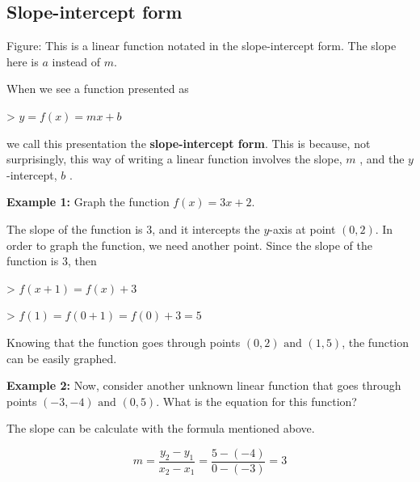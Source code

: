 \subsection{Slope-intercept form}
\label{sss:slop-2233}







Figure: This is a linear function notated in the slope-intercept form. The slope here is
$a$ instead of $m$.



When we see a function presented as



> $y=f(x)=mx+b$



we call this presentation the \textbf{slope-intercept form}. This is because, not
surprisingly, this way of writing a linear function involves the slope, $m$ , and the
$y$-intercept, $b$ .



\textbf{Example 1:} Graph the function $f(x)=3x+2$.



The slope of the function is 3, and it intercepts the $y$-axis at point $(0,2)$. In order
to graph the function, we need another point. Since the slope of the function is 3, then



> $f(x+1)=f(x)+3$



> $f(1)=f(0+1)=f(0)+3=5$



Knowing that the function goes through points $(0,2)\text{ and }(1,5)$, the function can
be easily graphed.



\textbf{Example 2:} Now, consider another unknown linear function that goes through points $(-3,-4)\text{ and }(0,5)$. What is the equation for this function?



The slope can be calculate with the formula mentioned above.



$$m=\frac{y _2-y _1}{x _2-x _1}=\frac{5-(-4)}{0-(-3)}=3$$



